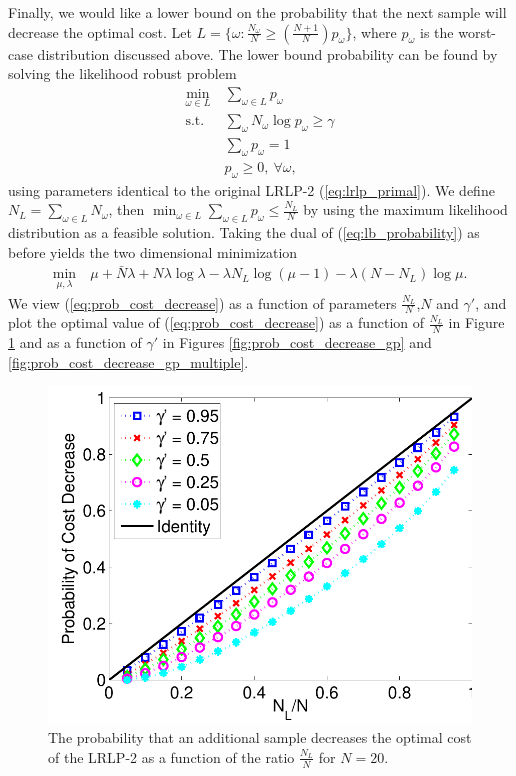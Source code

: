 \documentclass[11pt]{article}
\begin{document}
Finally, we would like a lower bound on the probability that the next sample will decrease the optimal cost.  Let $L = \{ \omega : \frac{N_{\omega}}{N} \geq \left( \frac{N+1}{N} \right) p_\omega \}$, where $p_\omega$ is the worst-case distribution discussed above.  The lower bound probability can be found by solving the likelihood robust problem
\begin{align}
	\min_{\omega \in L} \ & \sum_{\omega \in L} p_\omega \nonumber \\
	\mbox{s.t.} & \sum_\omega N_\omega \log p_\omega \geq \gamma \label{eq:lb_probability} \\
	& \sum_\omega p_\omega = 1 \nonumber \\
	& p_\omega \geq 0, \ \forall \omega, \nonumber
\end{align}
using parameters identical to the original LRLP-2 (\ref{eq:lrlp_primal}).  We define $N_L = \sum_{\omega \in L} N_\omega$, then $\min_{\omega \in L} \sum_{\omega \in L} p_\omega \leq \frac{N_L}{N}$ by using the maximum likelihood distribution as a feasible solution.  Taking the dual of (\ref{eq:lb_probability}) as before yields the two dimensional minimization
\begin{align}
	\min_{\mu,\lambda} \ & \mu + \bar{N}\lambda + N\lambda\log\lambda - \lambda N_L \log(\mu - 1) - \lambda (N-N_L) \log\mu. \label{eq:prob_cost_decrease}
\end{align}
We view (\ref{eq:prob_cost_decrease}) as a function of parameters $\tfrac{N_L}{N}$,$N$ and $\gamma'$, and plot the optimal value of (\ref{eq:prob_cost_decrease}) as a function of $\tfrac{N_L}{N}$ in Figure \ref{fig:prob_cost_decrease_nd_n} and as a function of $\gamma'$ in Figures \ref{fig:prob_cost_decrease_gp} and \ref{fig:prob_cost_decrease_gp_multiple}.

\begin{figure}
	\centering
	\includegraphics[width=.5\textwidth]{images/prob_dec_cost_v_nl_n_20}
	\caption{The probability that an additional sample decreases the optimal cost of the LRLP-2 as a function of the ratio $\frac{N_L}{N}$ for $N = 20$.}
	\label{fig:prob_cost_decrease_nd_n}
\end{figure}
\end{document}
